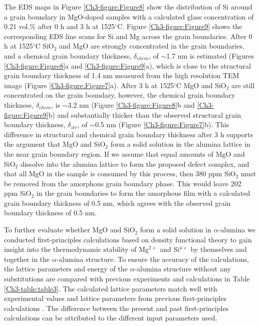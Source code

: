 The EDS maps in Figure \ref{Ch3-figure:Figure8} show the distribution of Si around a grain boundary in MgO-doped samples with a calculated glass concentration of 0.21 vol.\% after 0 h and 3 h at 1525$^{\circ}$C. Figure \ref{Ch3-figure:Figure9} shows the corresponding EDS line scans for Si and Mg across the grain boundaries. After 0 h at 1525$^{\circ}$C SiO$_{2}$ and MgO are strongly concentrated in the grain boundaries, and a chemical grain boundary thickness, $\delta_{chem}$, of $\sim$1.7 nm is estimated (Figures \ref{Ch3-figure:Figure8}a and \ref{Ch3-figure:Figure9}a), which is close to the structural grain boundary thickness of 1.4 nm measured from the high resolution TEM image (Figure \ref{Ch3-figure:Figure7}a). After 3 h at 1525$^{\circ}$C MgO and SiO$_{2}$ are still concentrated on the grain boundary, however, the chemical grain boundary thickness, $\delta_{chem}$, is $\sim$3.2 nm (Figure \ref{Ch3-figure:Figure8}b and \ref{Ch3-figure:Figure9}b) and substantially thicker than the observed structural grain boundary thickness, $\delta_{str}$, of $\sim$0.5 nm (Figure \ref{Ch3-figure:Figure7}b). This difference in structural and chemical grain boundary thickness after 3 h supports the argument that MgO and SiO$_{2}$ form a solid solution in the alumina lattice in the near grain boundary region. If we assume that equal amounts of MgO and SiO$_{2}$ dissolve into the alumina lattice to form the proposed defect complex, and that all MgO in the sample is consumed by this process, then 380 ppm SiO$_{2}$ must be removed from the amorphous grain boundary phase. This would leave 202 ppm SiO$_{2}$ in the grain boundaries to form the amorphous film with a calculated grain boundary thickness of 0.5 nm, which agrees with the observed grain boundary thickness of 0.5 nm.

To further evaluate whether MgO and SiO$_{2}$ form a solid solution in $\alpha$-alumina we conducted first-principles calculations based on density functional theory to gain insight into the thermodynamic stability of Mg$^{2+}$ and Si$^{4+}$ by themselves and together in the $\alpha$-alumina structure. To ensure the accuracy of the calculations, the lattice parameters and energy of the $\alpha$-alumina structure without any substitutions are compared with previous experiments and calculations in Table \ref{Ch3-table:table3}. The calculated lattice parameters match well with experimental values and lattice parameters from previous first-principles calculations \cite{Jain2013,MaterialsProject,Graham1960_595,Bergerhoff1983,Karlsruhe,Atkinson2003}. The difference between the present and past first-principles calculations can be attributed to the different input parameters used. 

